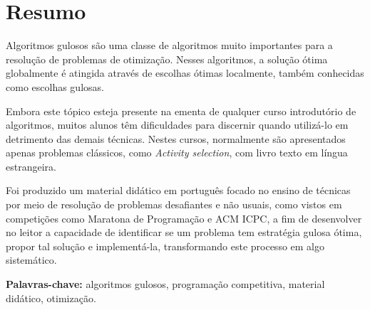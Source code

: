 \chapter*{Resumo}
\label{resumo}

Algoritmos gulosos são uma classe de algoritmos muito importantes para a resolução de problemas de otimização. Nesses algoritmos, a solução ótima globalmente é atingida através de escolhas ótimas localmente, também conhecidas como escolhas gulosas.

Embora este tópico esteja presente na ementa de qualquer curso introdutório de algoritmos, muitos alunos têm dificuldades para discernir quando utilizá-lo em detrimento das demais técnicas. Nestes cursos, normalmente são apresentados apenas problemas clássicos, como \emph{Activity selection}, com livro texto em língua estrangeira.

Foi produzido um material didático em português focado no ensino de técnicas por meio de resolução de problemas desafiantes e não usuais, como vistos em competições como Maratona de Programação e ACM ICPC, a fim de desenvolver no leitor a capacidade de identificar se um problema tem estratégia gulosa ótima, propor tal solução e implementá-la, transformando este processo em algo sistemático.


\textbf{Palavras-chave:} algoritmos gulosos, programação competitiva, material didático, otimização.
